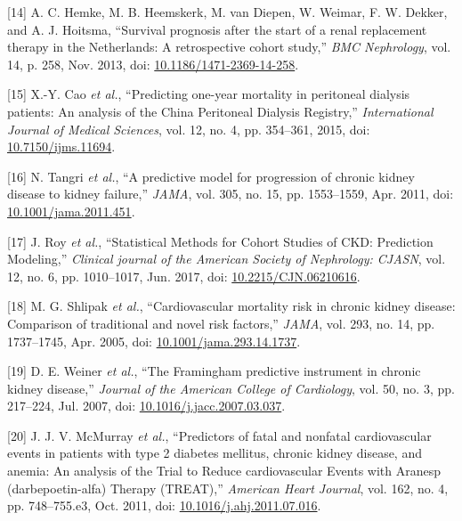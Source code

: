 \documentclass[12pt,twoside]{reedthesis}
\newenvironment{cslreferences}%
  {}%
  {\par}
\begin{document}
\begin{cslreferences}
\leavevmode\hypertarget{ref-hemke_survival_2013}{}%
{[}14{]} A. C. Hemke, M. B. Heemskerk, M. van Diepen, W. Weimar, F. W. Dekker, and A. J. Hoitsma, ``Survival prognosis after the start of a renal replacement therapy in the Netherlands: A retrospective cohort study,'' \emph{BMC Nephrology}, vol. 14, p. 258, Nov. 2013, doi: \href{https://doi.org/10.1186/1471-2369-14-258}{10.1186/1471-2369-14-258}.

\leavevmode\hypertarget{ref-cao_predicting_2015-1}{}%
{[}15{]} X.-Y. Cao \emph{et al.}, ``Predicting one-year mortality in peritoneal dialysis patients: An analysis of the China Peritoneal Dialysis Registry,'' \emph{International Journal of Medical Sciences}, vol. 12, no. 4, pp. 354--361, 2015, doi: \href{https://doi.org/10.7150/ijms.11694}{10.7150/ijms.11694}.

\leavevmode\hypertarget{ref-tangri_predictive_2011}{}%
{[}16{]} N. Tangri \emph{et al.}, ``A predictive model for progression of chronic kidney disease to kidney failure,'' \emph{JAMA}, vol. 305, no. 15, pp. 1553--1559, Apr. 2011, doi: \href{https://doi.org/10.1001/jama.2011.451}{10.1001/jama.2011.451}.

\leavevmode\hypertarget{ref-roy_statistical_2017}{}%
{[}17{]} J. Roy \emph{et al.}, ``Statistical Methods for Cohort Studies of CKD: Prediction Modeling,'' \emph{Clinical journal of the American Society of Nephrology: CJASN}, vol. 12, no. 6, pp. 1010--1017, Jun. 2017, doi: \href{https://doi.org/10.2215/CJN.06210616}{10.2215/CJN.06210616}.

\leavevmode\hypertarget{ref-shlipak_cardiovascular_2005}{}%
{[}18{]} M. G. Shlipak \emph{et al.}, ``Cardiovascular mortality risk in chronic kidney disease: Comparison of traditional and novel risk factors,'' \emph{JAMA}, vol. 293, no. 14, pp. 1737--1745, Apr. 2005, doi: \href{https://doi.org/10.1001/jama.293.14.1737}{10.1001/jama.293.14.1737}.

\leavevmode\hypertarget{ref-weiner_framingham_2007}{}%
{[}19{]} D. E. Weiner \emph{et al.}, ``The Framingham predictive instrument in chronic kidney disease,'' \emph{Journal of the American College of Cardiology}, vol. 50, no. 3, pp. 217--224, Jul. 2007, doi: \href{https://doi.org/10.1016/j.jacc.2007.03.037}{10.1016/j.jacc.2007.03.037}.

\leavevmode\hypertarget{ref-mcmurray_predictors_2011}{}%
{[}20{]} J. J. V. McMurray \emph{et al.}, ``Predictors of fatal and nonfatal cardiovascular events in patients with type 2 diabetes mellitus, chronic kidney disease, and anemia: An analysis of the Trial to Reduce cardiovascular Events with Aranesp (darbepoetin-alfa) Therapy (TREAT),'' \emph{American Heart Journal}, vol. 162, no. 4, pp. 748--755.e3, Oct. 2011, doi: \href{https://doi.org/10.1016/j.ahj.2011.07.016}{10.1016/j.ahj.2011.07.016}.


\end{cslreferences}
\end{document}
